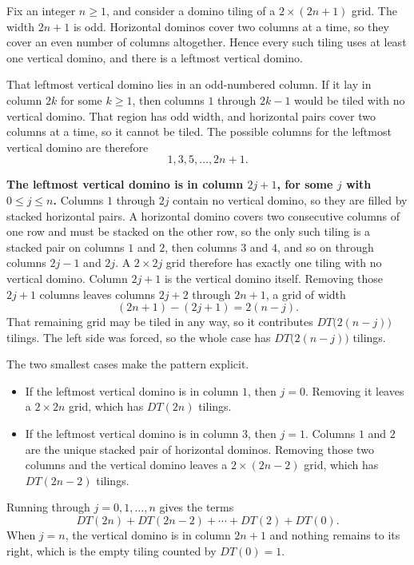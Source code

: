 \documentclass[11pt]{article}
\begin{document}
Fix an integer $n\ge 1$, and consider a domino tiling of a $2\times(2n+1)$ grid. The width $2n+1$ is odd. Horizontal dominos cover two columns at a time, so they cover an even number of columns altogether. Hence every such tiling uses at least one vertical domino, and there is a leftmost vertical domino.

That leftmost vertical domino lies in an odd-numbered column. If it lay in column $2k$ for some $k\ge 1$, then columns $1$ through $2k-1$ would be tiled with no vertical domino. That region has odd width, and horizontal pairs cover two columns at a time, so it cannot be tiled. The possible columns for the leftmost vertical domino are therefore
\[
1,3,5,\ldots,2n+1.
\]

\textbf{The leftmost vertical domino is in column $2j+1$, for some $j$ with $0\le j\le n$.}
Columns $1$ through $2j$ contain no vertical domino, so they are filled by stacked horizontal pairs. A horizontal domino covers two consecutive columns of one row and must be stacked on the other row, so the only such tiling is a stacked pair on columns $1$ and $2$, then columns $3$ and $4$, and so on through columns $2j-1$ and $2j$. A $2\times 2j$ grid therefore has exactly one tiling with no vertical domino. Column $2j+1$ is the vertical domino itself. Removing those $2j+1$ columns leaves columns $2j+2$ through $2n+1$, a grid of width
\[
(2n+1)-(2j+1)=2(n-j).
\]
That remaining grid may be tiled in any way, so it contributes $DT\bigl(2(n-j)\bigr)$ tilings. The left side was forced, so the whole case has $DT\bigl(2(n-j)\bigr)$ tilings.

The two smallest cases make the pattern explicit.

\begin{itemize}[leftmargin=1.6em, itemsep=0.35em, topsep=0.4em]
\item If the leftmost vertical domino is in column $1$, then $j=0$. Removing it leaves a $2\times 2n$ grid, which has $DT(2n)$ tilings.
\item If the leftmost vertical domino is in column $3$, then $j=1$. Columns $1$ and $2$ are the unique stacked pair of horizontal dominos. Removing those two columns and the vertical domino leaves a $2\times(2n-2)$ grid, which has $DT(2n-2)$ tilings.
\end{itemize}

Running through $j=0,1,\ldots,n$ gives the terms
\[
DT(2n)+DT(2n-2)+\cdots+DT(2)+DT(0).
\]
When $j=n$, the vertical domino is in column $2n+1$ and nothing remains to its right, which is the empty tiling counted by $DT(0)=1$.
\end{document}
